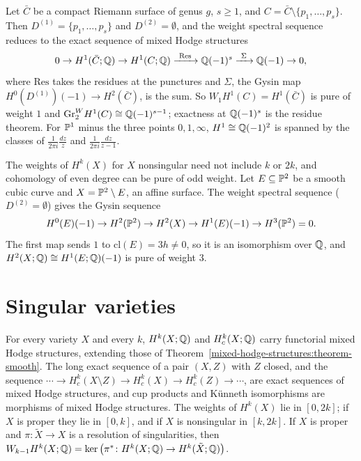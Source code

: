 \begin{example}\label{mixed-hodge-structures:example-punctured-curve}
Let $\bar C$ be a compact Riemann surface of genus $g$, $s \geq 1$, and $C = \bar C \setminus \{p_1, \ldots, p_s\}$. Then $D^{(1)} = \{p_1, \ldots, p_s\}$ and $D^{(2)} = \emptyset$, and the weight spectral
sequence reduces to the exact sequence of mixed Hodge structures
\[
0 \to H^1(\bar C; \QQ) \to H^1(C; \QQ) \xrightarrow{\ \mathrm{Res}\ } \QQ(-1)^{s} \xrightarrow{\ \Sigma\ } \QQ(-1) \to 0,
\]
where $\mathrm{Res}$ takes the residues at the punctures and $\Sigma$, the Gysin map $H^0(D^{(1)})(-1) \to H^2(\bar C)$, is the sum. So $W_1H^1(C) = H^1(\bar C)$ is pure of weight $1$ and
$\mathrm{Gr}^W_2H^1(C) \cong \mathbb{Q}(-1)^{s-1}$; exactness at $\mathbb{Q}(-1)^s$ is the residue theorem. For $\mathbb{P}^1$ minus the three points $0, 1, \infty$, $H^1 \cong \mathbb{Q}(-1)^2$ is spanned by the classes of
$\frac{1}{2\pi i}\frac{dz}{z}$ and $\frac{1}{2\pi i}\frac{dz}{z - 1}$.
\end{example}

\begin{counterexample}\label{mixed-hodge-structures:counterexample-odd-weight}
The weights of $H^k(X)$ for $X$ nonsingular need not include $k$ or $2k$, and cohomology of even degree can be pure of odd weight. Let $E \subseteq \mathbb{P}^2$ be a smooth cubic curve and $X = \mathbb{P}^2 \setminus E$,
an affine surface. The weight spectral sequence ($D^{(2)} = \emptyset$) gives the Gysin sequence
\[
H^0(E)(-1) \to H^2(\mathbb{P}^2) \to H^2(X) \to H^1(E)(-1) \to H^3(\mathbb{P}^2) = 0.
\]
The first map sends $1$ to $\mathrm{cl}(E) = 3h \neq 0$, so it is an isomorphism over $\mathbb{Q}$, and $H^2(X; \mathbb{Q}) \cong H^1(E; \mathbb{Q})(-1)$ is pure of weight $3$.
\end{counterexample}

\section{Singular varieties}\label{mixed-hodge-structures:section-singular}

\begin{theorem}[Deligne]\label{mixed-hodge-structures:theorem-singular}
For every variety $X$ and every $k$, $H^k(X; \mathbb{Q})$ and $H^k_c(X; \mathbb{Q})$ carry functorial mixed Hodge structures, extending those of Theorem~\ref{mixed-hodge-structures:theorem-smooth}. The long exact
sequence of a pair $(X, Z)$ with $Z$ closed, and the sequence $\cdots \to H^k_c(X \setminus Z) \to H^k_c(X) \to H^k_c(Z) \to \cdots$, are exact sequences of mixed Hodge structures, and cup products and
K\"unneth isomorphisms are morphisms of mixed Hodge structures. The weights of $H^k(X)$ lie in $[0, 2k]$; if $X$ is proper they lie in $[0, k]$, and if $X$ is nonsingular in $[k, 2k]$. If $X$ is proper and
$\pi \colon \tilde X \to X$ is a resolution of singularities, then $W_{k-1}H^k(X; \mathbb{Q}) = \ker\big(\pi^* \colon H^k(X; \mathbb{Q}) \to H^k(\tilde X; \mathbb{Q})\big)$.
\end{theorem}

